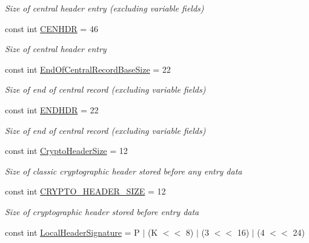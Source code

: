 \begin{DoxyCompactItemize}
\begin{DoxyCompactList}\small\item\em Size of central header entry (excluding variable fields) \end{DoxyCompactList}\item 
const int \hyperlink{class_i_c_sharp_code_1_1_sharp_zip_lib_1_1_zip_1_1_zip_constants_a9cc8063d393872f7b853b0e9bd6d0086}{C\+E\+N\+H\+DR} = 46
\begin{DoxyCompactList}\small\item\em Size of central header entry \end{DoxyCompactList}\item 
const int \hyperlink{class_i_c_sharp_code_1_1_sharp_zip_lib_1_1_zip_1_1_zip_constants_aef5c18aa2d7b0ff91239c0699eaf82de}{End\+Of\+Central\+Record\+Base\+Size} = 22
\begin{DoxyCompactList}\small\item\em Size of end of central record (excluding variable fields) \end{DoxyCompactList}\item 
const int \hyperlink{class_i_c_sharp_code_1_1_sharp_zip_lib_1_1_zip_1_1_zip_constants_ac83eb90005b7649baa27afe4b75b8852}{E\+N\+D\+H\+DR} = 22
\begin{DoxyCompactList}\small\item\em Size of end of central record (excluding variable fields) \end{DoxyCompactList}\item 
const int \hyperlink{class_i_c_sharp_code_1_1_sharp_zip_lib_1_1_zip_1_1_zip_constants_a781293ea9d82f74e7a2a347f8f492442}{Crypto\+Header\+Size} = 12
\begin{DoxyCompactList}\small\item\em Size of \textquotesingle{}classic\textquotesingle{} cryptographic header stored before any entry data \end{DoxyCompactList}\item 
const int \hyperlink{class_i_c_sharp_code_1_1_sharp_zip_lib_1_1_zip_1_1_zip_constants_a1fb1943be9181baea7faab82bb054d6a}{C\+R\+Y\+P\+T\+O\+\_\+\+H\+E\+A\+D\+E\+R\+\_\+\+S\+I\+ZE} = 12
\begin{DoxyCompactList}\small\item\em Size of cryptographic header stored before entry data \end{DoxyCompactList}\item 
const int \hyperlink{class_i_c_sharp_code_1_1_sharp_zip_lib_1_1_zip_1_1_zip_constants_a79c05464036ae958b0638fdde6f40ae4}{Local\+Header\+Signature} = \textquotesingle{}P\textquotesingle{} $\vert$ (\textquotesingle{}K\textquotesingle{} $<$$<$ 8) $\vert$ (3 $<$$<$ 16) $\vert$ (4 $<$$<$ 24)
$$
\end{DoxyCompactItemize}
